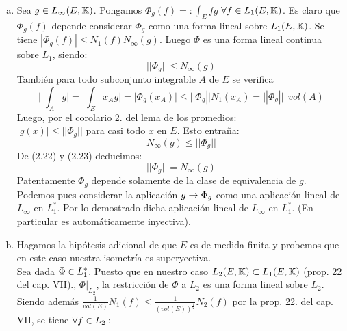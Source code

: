 \begin{enumerate}[a)]
\item Sea $g \in L_\infty (E,\mathbb{K})$. Pongamos $\Phi_g (f)=: \int_E fg$ $\forall f \in L_1 (E,\mathbb{K})$. Es claro que $\Phi_g (f)$ depende considerar $\Phi_g$ como una forma lineal sobre $L_1 (E,\mathbb{K})$. Se tiene $| \Phi_g (f)| \leq N_1 (f) N_\infty (g)$. Luego $\Phi$ es una forma lineal continua sobre $L_1$, siendo: 
\begin{equation}
|| \Phi_g || \leq N_\infty (g)
\end{equation}
También para todo subconjunto integrable $A$ de $E$ se verifica 
$$
|| \int_A g |=| \int_E x_A g |=| \Phi_g (x_A)| \leq || \Phi_g || N_1 (x_A)= || \Phi_g || \phantom{s} vol(A)
$$
Luego, por el corolario 2. del lema de los promedios:\\
$|g(x)| \leq || \Phi_g ||$ para casi todo $x$ en $E$. Esto entraña:\\
\begin{equation}
N_\infty(g) \leq || \Phi_g ||
\end{equation}
De (2.22) y (2.23) deducimos:
$$
|| \Phi_g || =N_\infty (g)
$$
Patentamente $\Phi_g$ depende solamente de la clase de equivalencia de $g$. Podemos pues considerar la aplicación $g \rightarrow \Phi_g$ como una aplicación lineal de $L_\infty$ en $L_1^*$. Por lo demostrado dicha  aplicación lineal de $L_\infty$ en $L_1^*$. (En particular es automáticamente inyectiva). 
\item  Hagamos la hipótesis adicional de que $E$ es de medida finita y probemos que en este caso nuestra isometría es superyectiva. \\
Sea dada $\Phi \in L_1^*$. Puesto que en nuestro caso $L_2 (E,\mathbb{K}) \subset L_1 (E,\mathbb{K})$ (prop. 22 del cap. VII)., $\Phi |_{L_2}$, la restricción de $\Phi$ a $L_2$ es una forma lineal sobre $L_2$. Siendo además $\frac{1}{vol (E)}N_1 (f) \leq \frac{1}{(vol(E))^\frac{1}{2}}N_2(f)$ por la prop. 22. del cap. VII, se tiene $\forall f \in L_2:$


\end{enumerate}
